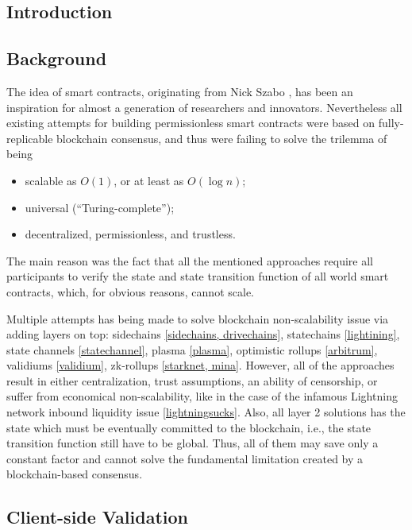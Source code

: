 \documentclass[9pt,oneside]{amsart}
\begin{document}
\thispagestyle{empty}
\setlength{\columnsep}{20pt}
\begin{multicols}{2}

\section{Introduction}

\subsection{Background}

The idea of smart contracts, originating from Nick Szabo \cite{Szabo},
has been an inspiration for almost a generation of researchers and innovators.
Nevertheless all existing attempts for building permissionless smart contracts
were based on fully-replicable blockchain consensus,
and thus were failing to solve the trilemma of being
\begin{itemize}
    \item scalable as $O(1)$, or at least as $O(\log n)$;
    \item universal (``Turing-complete'');
    \item decentralized, permissionless, and trustless.
\end{itemize}

The main reason was the fact that all the mentioned approaches require
all participants to verify the state and state transition function of all world smart contracts,
which, for obvious reasons, cannot scale.

Multiple attempts has being made to solve blockchain non-scalability issue
via adding layers on top: sidechains \ref{sidechains, drivechains},
statechains \ref{lightining}, state channels \ref{statechannel}, plasma \ref{plasma},
optimistic rollups \ref{arbitrum}, validiums \ref{validium}, zk-rollups \ref{starknet, mina}.
However, all of the approaches result in either
centralization, trust assumptions, an ability of censorship,
or suffer from economical non-scalability,
like in the case of the infamous Lightning network inbound liquidity issue \ref{lightningsucks}.
Also, all layer 2 solutions has the state which must be eventually committed
to the blockchain, i.e., the state transition function still have to be global.
Thus, all of them may save only a constant factor and cannot solve the fundamental
limitation created by a blockchain-based consensus.

\subsection{Client-side Validation}


\end{multicols}
\end{document}
